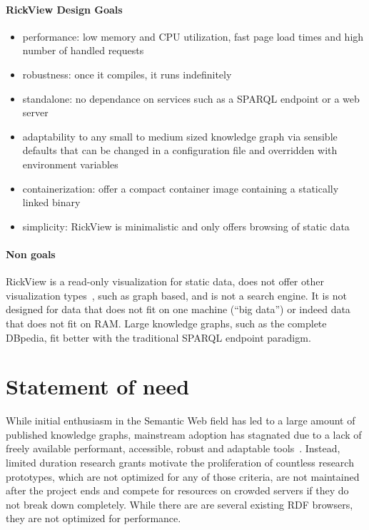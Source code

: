 \documentclass[a4paper]{article}
\begin{document}
\paragraph{RickView Design Goals}
\begin{itemize}
\item
  performance: low memory and CPU utilization, fast page load times and high number of handled requests
\item
  robustness: once it compiles, it runs indefinitely
\item
  standalone: no dependance on services such as a SPARQL endpoint or a web server
\item
  adaptability to any small to medium sized knowledge graph via sensible defaults that can be changed in a configuration file and overridden with environment variables
\item
  containerization: offer a compact container image containing a statically linked binary
\item
  simplicity: RickView is minimalistic and only offers browsing of static data
\end{itemize}

\paragraph{Non goals}
RickView is a read-only visualization for static data, does not offer other visualization types~\citep{linkeddatavisualization}, such as graph based, and is not a search engine.
It is not designed for data that does not fit on one machine (\enquote{big data}) or indeed data that does not fit on RAM.
Large knowledge graphs, such as the complete DBpedia, fit better with the traditional SPARQL endpoint paradigm.

\section{Statement of need}\label{statement-of-need}

While initial enthusiasm in the Semantic Web field has led to a large amount of published knowledge graphs, mainstream adoption has stagnated due to a lack of freely available performant, accessible, robust and adaptable tools~\citep{semanticwebreview}.
Instead, limited duration research grants motivate the proliferation of countless research prototypes, which are not optimized for any of those criteria, are not maintained after the project ends and compete for resources on crowded servers if they do not break down completely.
While there are are several existing RDF browsers, they are not optimized for performance.
\end{document}
